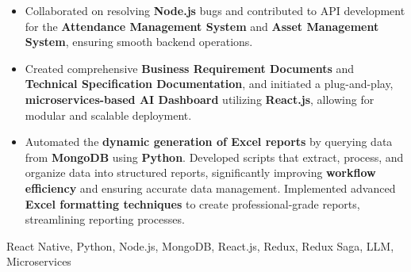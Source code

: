 \begin{experiences}
{\begin{itemize}
        \item Collaborated on resolving \textbf{Node.js} bugs and contributed to API development for the \textbf{Attendance Management System} and \textbf{Asset Management System}, ensuring smooth backend operations.
        \item Created comprehensive \textbf{Business Requirement Documents} and \textbf{Technical Specification Documentation}, and initiated a plug-and-play, \textbf{microservices-based AI Dashboard} utilizing \textbf{React.js}, allowing for modular and scalable deployment.
        \item Automated the \textbf{dynamic generation of Excel reports} by querying data from \textbf{MongoDB} using \textbf{Python}. Developed scripts that extract, process, and organize data into structured reports, significantly improving \textbf{workflow efficiency} and ensuring accurate data management. Implemented advanced \textbf{Excel formatting techniques} to create professional-grade reports, streamlining reporting processes.
      \end{itemize}
    }
    {React Native, Python, Node.js, MongoDB, React.js, Redux, Redux Saga, LLM, Microservices}


\end{experiences}
